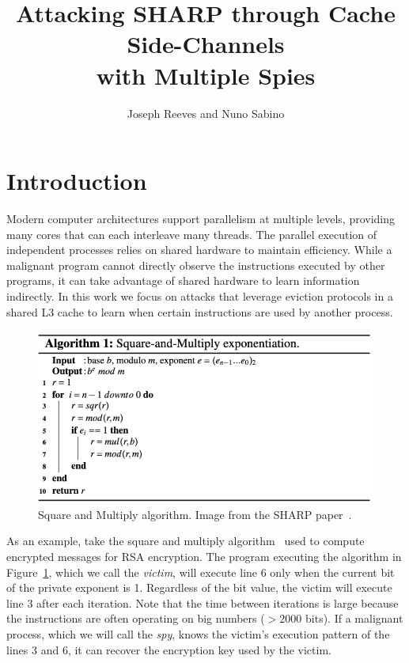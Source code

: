 \documentclass[12pt]{article}
\title{Attacking SHARP through Cache Side-Channels\\with Multiple Spies}
\author{Joseph Reeves and Nuno Sabino}
\begin{document}
\maketitle


\section{Introduction}

Modern computer architectures support parallelism at multiple levels, providing many cores that can each interleave many threads.
The parallel execution of independent processes relies on shared hardware to maintain efficiency.
While a malignant program cannot directly observe the instructions executed by other programs,
it can take advantage of shared hardware to learn information indirectly.
In this work we focus on attacks that leverage eviction protocols in a shared L3 cache to learn when certain instructions are used by another process.

\begin{figure}[h]
\centering
\includegraphics[scale=0.9]{../presentation/sqm.png}
\caption{Square and Multiply algorithm. Image from the SHARP paper~\cite{sharp}.}
\label{fig:sm}
\end{figure}

As an example, take the square and multiply algorithm~\cite{exp} used to compute encrypted messages for RSA encryption.
The program executing the algorithm in Figure~\ref{fig:sm}, which we call the {\it victim}, will execute line $6$ only when the current bit of the private exponent is 1. 
Regardless of the bit value, the victim will execute line $3$ after each iteration.
Note that the time between iterations is large because the instructions are often operating on big numbers ($> 2000$ bits).
If a malignant process, which we will call the {\it spy}, knows the victim's execution pattern of the lines $3$ and $6$, it can recover the encryption key used by the victim.
\end{document}
